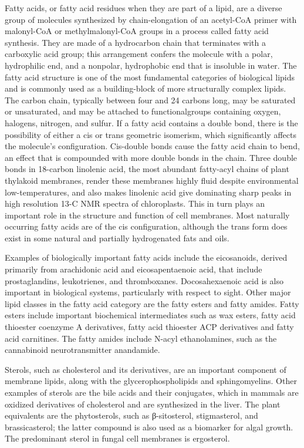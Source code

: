 Fatty acids, or fatty acid residues when they are part of a lipid, are a diverse group of molecules synthesized by chain-elongation of an acetyl-CoA primer with malonyl-CoA or methylmalonyl-CoA groups in a process called fatty acid synthesis. They are made of a hydrocarbon chain that terminates with a carboxylic acid group; this arrangement confers the molecule with a polar, hydrophilic end, and a nonpolar, hydrophobic end that is insoluble in water. The fatty acid structure is one of the most fundamental categories of biological lipids and is commonly used as a building-block of more structurally complex lipids. The carbon chain, typically between four and 24 carbons long, may be saturated or unsaturated, and may be attached to functionalgroups containing oxygen, halogens, nitrogen, and sulfur. If a fatty acid contains a double bond, there is the possibility of either a cis or trans geometric isomerism, which significantly affects the molecule's configuration. Cis-double bonds cause the fatty acid chain to bend, an effect that is compounded with more double bonds in the chain. Three double bonds in 18-carbon linolenic acid, the most abundant fatty-acyl chains of plant thylakoid membranes, render these membranes highly fluid despite environmental low-temperatures, and also makes linolenic acid give dominating sharp peaks in high resolution 13-C NMR spectra of chloroplasts. This in turn plays an important role in the structure and function of cell membranes. Most naturally occurring fatty acids are of the cis configuration, although the trans form does exist in some natural and partially hydrogenated fats and oils.

Examples of biologically important fatty acids include the eicosanoids, derived primarily from arachidonic acid and eicosapentaenoic acid, that include prostaglandins, leukotrienes, and thromboxanes. Docosahexaenoic acid is also important in biological systems, particularly with respect to sight. Other major lipid classes in the fatty acid category are the fatty esters and fatty amides. Fatty esters include important biochemical intermediates such as wax esters, fatty acid thioester coenzyme A derivatives, fatty acid thioester ACP derivatives and fatty acid carnitines. The fatty amides include N-acyl ethanolamines, such as the cannabinoid neurotransmitter anandamide.

Sterols, such as cholesterol and its derivatives, are an important component of membrane lipids, along with the glycerophospholipids and sphingomyelins. Other examples of sterols are the bile acids and their conjugates, which in mammals are oxidized derivatives of cholesterol and are synthesized in the liver. The plant equivalents are the phytosterols, such as β-sitosterol, stigmasterol, and brassicasterol; the latter compound is also used as a biomarker for algal growth. The predominant sterol in fungal cell membranes is ergosterol.

